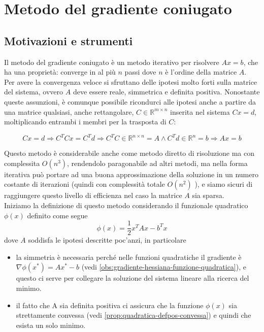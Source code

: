 

\inbpdocument 

\chapter{Metodo del gradiente coniugato}
\label{chap:metodo-gradiente-coniugato}
\section{Motivazioni e strumenti} Il metodo del gradiente coniugato \`e
un metodo iterativo per risolvere $Ax = b$, che ha una proprietà:
converge in al più $n$ passi dove $n$ \`e l'ordine della matrice $A$.\\
Per avere la convergenza veloce si sfruttano delle ipotesi molto forti
sulla matrice del sistema, ovvero $A$ deve essere reale, simmetrica e
definita positiva.  Nonostante queste assunzioni, \`e comunque possibile
ricondurci alle ipotesi anche a partire da una matrice qualsiasi,
anche rettangolare, $C \in \mathbb{R}^{m \times n}$ inserita nel
sistema $C x = d$, moltiplicando entrambi i membri per la trasposta di
$C$:

$$ Cx = d \Rightarrow C^{T}Cx = C^{T} d \Rightarrow C^{T}C \in \mathbb {R}^ {n \times n} = A \wedge  C^{T}d \in \mathbb {R}^{n} = b \Rightarrow Ax = b $$ 

Questo metodo \`e considerabile anche come metodo diretto di risoluzione
ma con complessita $O(n^{3})$, rendendolo paragonabile ad altri
metodi, ma nella forma iterativa può portare ad una buona
approssimazione della soluzione in un numero costante di iterazioni
(quindi con complessità totale $O(n^{2})$ ), e siamo sicuri di
raggiungere questo livello di efficienza nel caso la matrice $A$ sia
sparsa.\\

Iniziamo la definizione di questo metodo considerando il funzionale
quadratico $\phi(x)$ definito come segue
$$ \phi(x) = \frac{1}{2}x^{T} A x - b^{T}x$$
dove $A$ soddisfa le ipotesi descritte poc'anzi, in particolare 
\begin{itemize}
\item la simmetria \`e necessaria perché nelle funzioni quadratiche
  il gradiente \`e $\nabla \phi(x^{*}) = Ax^{*} - b$
  (vedi \ref{obs:gradiente-hessiana-funzione-quadratica}), e questo ci serve
  per collegare la soluzione del sistema lineare alla ricerca del minimo.
\item il fatto che A sia definita positiva ci assicura che la funzione
  $\phi(x)$ sia strettamente convessa
  (vedi \ref{prop:quadratica-defpos-convessa}) e quindi che esista un solo
  minimo.
\end{itemize}

